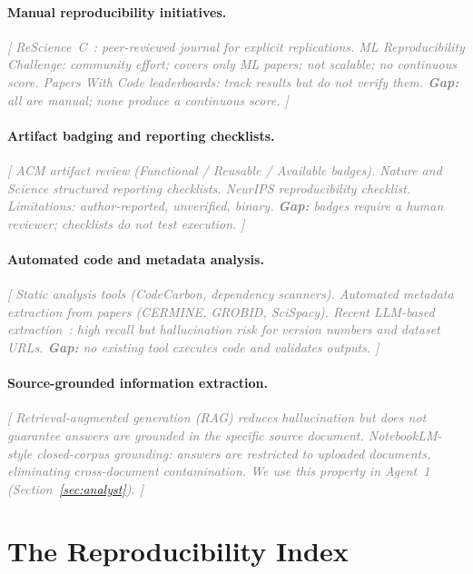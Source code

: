 \documentclass{article}
\newcommand{\outline}[1]{\textcolor{gray}{\textit{[#1]}}}
\begin{document}
\paragraph{Manual reproducibility initiatives.}
\outline{%
  ReScience~C~\cite{rescience}: peer-reviewed journal for explicit
  replications.
  ML Reproducibility Challenge: community effort; covers only ML papers;
  not scalable; no continuous score.
  Papers With Code leaderboards: track results but do not verify them.
  \textbf{Gap:} all are manual; none produce a continuous score.
}

\paragraph{Artifact badging and reporting checklists.}
\outline{%
  ACM artifact review (Functional / Reusable / Available badges).
  Nature and Science structured reporting checklists.
  NeurIPS reproducibility checklist.
  Limitations: author-reported, unverified, binary.
  \textbf{Gap:} badges require a human reviewer; checklists do not test
  execution.
}

\paragraph{Automated code and metadata analysis.}
\outline{%
  Static analysis tools (CodeCarbon, dependency scanners).
  Automated metadata extraction from papers (CERMINE, GROBID, SciSpacy).
  Recent LLM-based extraction~\cite{todo_llm_extraction}: high recall but
  hallucination risk for version numbers and dataset URLs.
  \textbf{Gap:} no existing tool executes code and validates outputs.
}

\paragraph{Source-grounded information extraction.}
\outline{%
  Retrieval-augmented generation (RAG) reduces hallucination but does not
  guarantee answers are grounded in the \emph{specific} source document.
  NotebookLM-style closed-corpus grounding: answers are restricted to
  uploaded documents, eliminating cross-document contamination.
  We use this property in Agent~1 (Section~\ref{sec:analyst}).
}

\section{The Reproducibility Index}
\label{sec:index}
\end{document}
